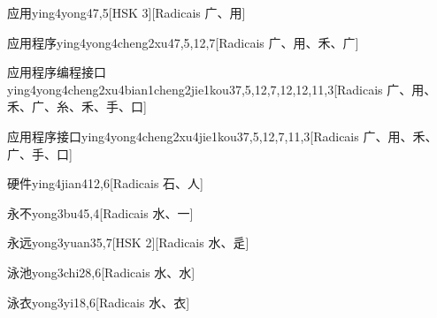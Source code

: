 \begin{entry}{应用}{ying4yong4}{7,5}[HSK 3][Radicais ⼴、⽤]
\end{entry}

\begin{entry}{应用程序}{ying4yong4cheng2xu4}{7,5,12,7}[Radicais ⼴、⽤、⽲、⼴]
\end{entry}

\begin{entry*}{应用程序编程接口}{ying4yong4cheng2xu4bian1cheng2jie1kou3}{7,5,12,7,12,12,11,3}[Radicais ⼴、⽤、⽲、⼴、⽷、⽲、⼿、⼝]
\end{entry*}

\begin{entry}{应用程序接口}{ying4yong4cheng2xu4jie1kou3}{7,5,12,7,11,3}[Radicais ⼴、⽤、⽲、⼴、⼿、⼝]
\end{entry}

\begin{entry}{硬件}{ying4jian4}{12,6}[Radicais ⽯、⼈]
\end{entry}

\begin{entry}{永不}{yong3bu4}{5,4}[Radicais ⽔、⼀]
\end{entry}

\begin{entry}{永远}{yong3yuan3}{5,7}[HSK 2][Radicais ⽔、⾡]
\end{entry}

\begin{entry}{泳池}{yong3chi2}{8,6}[Radicais ⽔、⽔]
\end{entry}

\begin{entry}{泳衣}{yong3yi1}{8,6}[Radicais ⽔、⾐]
\end{entry}

